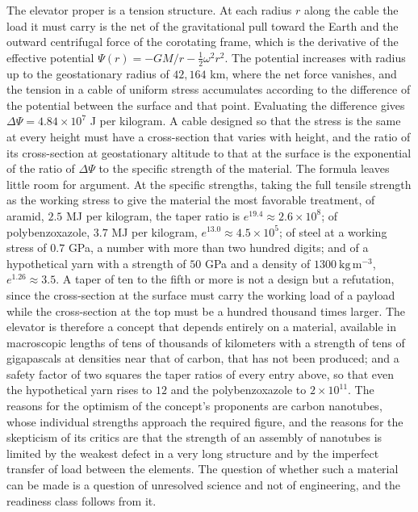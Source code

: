 The elevator proper is a tension structure. At each radius $r$ along the cable the load it must carry is the net of the gravitational pull toward the Earth and the outward centrifugal force of the corotating frame, which is the derivative of the effective potential $\Psi(r)=-GM/r-\tfrac12\omega^2r^2$. The potential increases with radius up to the geostationary radius of $42{,}164$ km, where the net force vanishes, and the tension in a cable of uniform stress accumulates according to the difference of the potential between the surface and that point. Evaluating the difference gives $\Delta\Psi=4.84\times10^{7}$ J per kilogram. A cable designed so that the stress is the same at every height must have a cross-section that varies with height, and the ratio of its cross-section at geostationary altitude to that at the surface is the exponential of the ratio of $\Delta\Psi$ to the specific strength of the material. The formula leaves little room for argument. At the specific strengths, taking the full tensile strength as the working stress to give the material the most favorable treatment, of aramid, $2.5$ MJ per kilogram, the taper ratio is $e^{19.4}\approx2.6\times10^{8}$; of polybenzoxazole, $3.7$ MJ per kilogram, $e^{13.0}\approx4.5\times10^{5}$; of steel at a working stress of $0.7$ GPa, a number with more than two hundred digits; and of a hypothetical yarn with a strength of $50$ GPa and a density of $1300\ \mathrm{kg\,m^{-3}}$, $e^{1.26}\approx3.5$. A taper of ten to the fifth or more is not a design but a refutation, since the cross-section at the surface must carry the working load of a payload while the cross-section at the top must be a hundred thousand times larger. The elevator is therefore a concept that depends entirely on a material, available in macroscopic lengths of tens of thousands of kilometers with a strength of tens of gigapascals at densities near that of carbon, that has not been produced; and a safety factor of two squares the taper ratios of every entry above, so that even the hypothetical yarn rises to $12$ and the polybenzoxazole to $2\times10^{11}$. The reasons for the optimism of the concept's proponents are carbon nanotubes, whose individual strengths approach the required figure, and the reasons for the skepticism of its critics are that the strength of an assembly of nanotubes is limited by the weakest defect in a very long structure and by the imperfect transfer of load between the elements. The question of whether such a material can be made is a question of unresolved science and not of engineering, and the readiness class follows from it.

